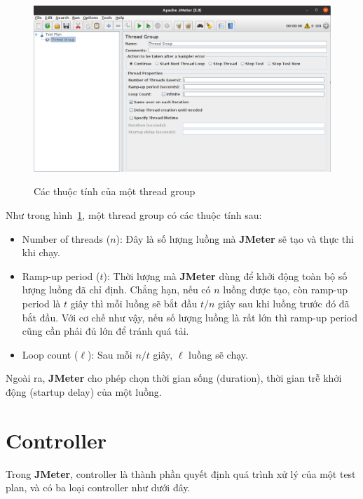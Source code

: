 \documentclass[10pt]{report}
\newcommand{\jmeter}{\textbf{JMeter}}
\begin{document}
\FloatBarrier{}
\begin{figure}[htp]
    \centering
    \includegraphics[scale=0.3]{thread-group.png}
    \caption{Các thuộc tính của một thread group}
    {\label{fig:thread-group}}
\end{figure}
\FloatBarrier{}

\par Như trong hình~\ref{fig:thread-group}, một thread group có các thuộc tính sau:
\begin{itemize}
    \item Number of threads ($n$): Đây là số lượng luồng mà \jmeter{} sẽ tạo và thực thi khi chạy.
    \item Ramp-up period ($t$): Thời lượng mà \jmeter{} dùng để khởi động toàn bộ số lượng luồng đã chỉ định. Chẳng hạn, nếu có $n$ luồng được tạo, còn ramp-up period là $t$ giây thì mỗi luồng sẽ bắt đầu $t/n$ giây sau khi luồng trước đó đã bắt đầu. Với cơ chế như vậy, nếu số lượng luồng là rất lớn thì ramp-up period cũng cần phải đủ lớn để tránh quá tải.
    \item Loop count ($\ell$): Sau mỗi $n/t$ giây, $\ell$ luồng sẽ chạy.
\end{itemize}

\par Ngoài ra, \jmeter{} cho phép chọn thời gian sống (duration), thời gian trễ khởi động (startup delay) của một luồng.

\section{Controller}

\par Trong \jmeter{}, controller là thành phần quyết định quá trình xử lý của một test plan, và có ba loại controller như dưới đây.
\end{document}
